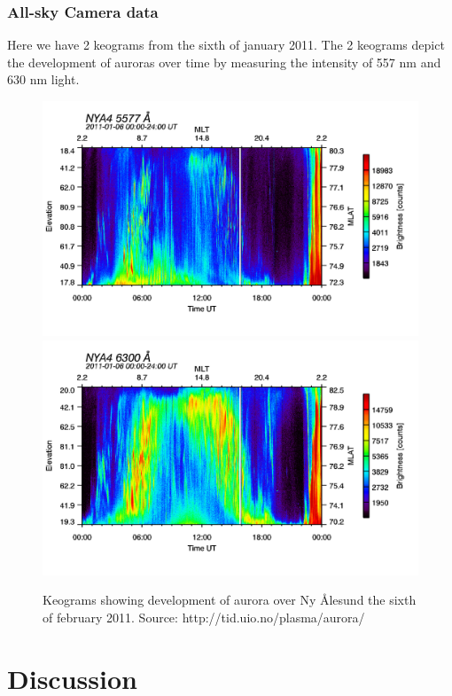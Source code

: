 \documentclass[norsk,a4paper,12pt]{article}
\begin{document}
\subsubsection{All-sky Camera data}
Here we have 2 keograms from the sixth of january 2011. The 2 keograms depict the development of auroras over time by measuring the intensity of 557 nm and 630 nm light.

\begin{figure}[H]
\includegraphics[scale = 0.2]{Figures/nya4_20110106_0000-2400_5577.png}
\includegraphics[scale = 0.2]{Figures/nya4_20110106_0000-2400_6300.png}
\centering
\caption{Keograms showing development of aurora over Ny Ålesund the sixth of february 2011. Source: http://tid.uio.no/plasma/aurora/}
\end{figure}
 


\section{Discussion} %
\label{sec:discussion}
\end{document}
